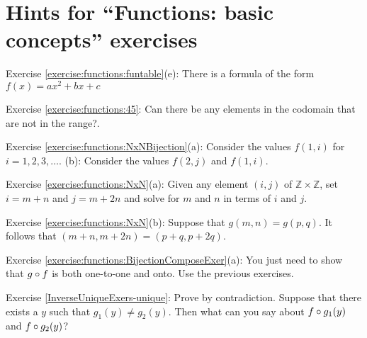 \section{Hints for ``Functions: basic concepts'' exercises}\label{sec:functions:hints}

\noindent Exercise \ref{exercise:functions:funtable}(e): There is a formula of the form $f(x) = ax^2 + bx + c$

\noindent Exercise \ref{exercise:functions:45}: Can there be any elements in the codomain that are not in the range?.

\noindent Exercise \ref{exercise:functions:NxNBijection}(a): Consider the values $f(1,i)$  for $i=1,2,3,\ldots$. (b): Consider  the values $f(2,j)$ and $f(1,i)$.

\noindent Exercise \ref{exercise:functions:NxN}(a): Given any element $(i,j)$ of $\mathbb{Z} \times \mathbb{Z}$, set $i=m+n$ and $j=m+2n$ and solve for $m$ and $n$ in terms of $i$ and $j$.

\noindent Exercise \ref{exercise:functions:NxN}(b): Suppose that $g(m,n) = g(p,q)$. It follows that $(m + n, m + 2n) = (p + q, p + 2q)$. %

\noindent Exercise \ref{exercise:functions:BijectionComposeExer}(a): You just need to show that $g \circ f$ is both one-to-one and onto. Use the previous exercises.

\noindent Exercise \ref{InverseUniqueExers-unique}: Prove by contradiction. Suppose that there exists a $y$ such that $g_1(y) \neq g_2(y)$.  Then what can you say about $f \circ g_1(y)$ and  $f \circ  g_2(y)$?
